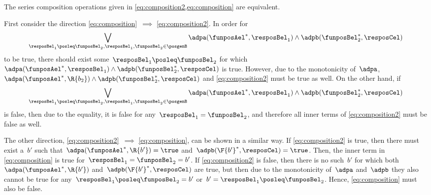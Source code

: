 \begin{remark}
  \label{lem:composition_equivalency}
  The series composition operations given in \cref{eq:composition2,eq:composition} are equivalent.

  First consider the direction \cref{eq:composition}~$\implies$ \cref{eq:composition2}. In order for%
  \begin{equation*}
    \bigvee_{\resposBel_1\posleq\funposBel_2, \resposBel_1,\funposBel_2\in \posgenB} \adpa(\funposAel^*,\resposBel_1) \wedge \adpb(\funposBel_2^*,\resposCel)%
  \end{equation*}
  to be true, there should exist some~$\resposBel_1\posleq \funposBel_2$ for which~$\adpa(\funposAel^*,\resposBel_1) \wedge \adpb(\funposBel_2^*,\resposCel)$ is true.
  However, due to the monotonicity of~$\adpa$,~$\adpa(\funposAel^*,\R{b_2}) \wedge \adpb(\funposBel_2^*,\resposCel)$ and \cref{eq:composition2} must be true as well.
  On the other hand, if%
  \begin{equation*}
    \bigvee_{\resposBel_1\posleq\funposBel_2, \resposBel_1,\funposBel_2\in \posgenB} \adpa(\funposAel^*,\resposBel_1) \wedge \adpb(\funposBel_2^*,\resposCel)%
  \end{equation*}
  is false, then due to the equality, it is false for any~$\resposBel_1=\funposBel_2$, and therefore all inner terms of \cref{eq:composition2} must be false as well.

  The other direction, \cref{eq:composition2}~$\implies$ \cref{eq:composition}, can be shown in a similar way.
  If \cref{eq:composition2} is true, then there must exist a~$b'$ such that~$\adpa(\funposAel^*, \R{b'})=\true$ and~$\adpb(\F{b'}^*, \resposCel)=\true$.
  Then, the inner term in \cref{eq:composition} is true for~$\resposBel_1=\funposBel_2=b'$.
  If \cref{eq:composition2} is false, then there is no such~$b'$ for which both~$\adpa(\funposAel^*, \R{b'})$ and~$\adpb(\F{b'}^*, \resposCel)$ are true, but then due to the monotonicity of~$\adpa$ and~$\adpb$ they also cannot be true for any~$\resposBel_1 \posleq \funposBel_2 = b'$ or~$b'=\resposBel_1 \posleq \funposBel_2$.
  Hence, \cref{eq:composition} must also be false.
\end{remark}
